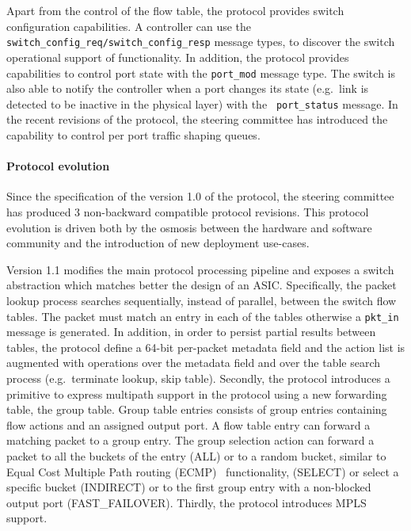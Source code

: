 Apart from the control of the flow table, the \of protocol provides switch
configuration capabilities. A controller can use the {\tt
  switch\_config\_req/switch\_config\_resp} message types, to discover the
switch operational support of \of functionality.  In addition, the protocol
provides capabilities to control port state with the {\tt port\_mod} message
type. The switch is also able to notify the controller when a port changes its
state (e.g.~link is detected to be inactive in the physical layer) with the {\tt
  port\_status} message. In the recent revisions of the protocol, the steering
committee has introduced the capability to control per port traffic shaping
queues. 

\paragraph{Protocol evolution} 

Since the specification of the version 1.0 of the protocol, the \of steering
committee has produced 3 non-backward compatible protocol revisions. This
protocol evolution is driven both by the osmosis between the hardware and
software community and the introduction of new deployment use-cases. 

Version 1.1  modifies the main protocol processing pipeline and exposes a switch
abstraction which matches better the design of an ASIC\@. Specifically, the packet
lookup process searches sequentially, instead of parallel, between the switch
flow tables.  The packet must match an entry in each of the tables otherwise a
{\tt pkt\_in} message is generated. In addition, in order to persist partial
results between tables, the protocol define a 64-bit per-packet metadata field
and the action list is augmented with operations over the metadata field and
over the table search process (e.g.~terminate lookup, skip table).  Secondly,
the protocol introduces a primitive to express multipath support in the protocol
using a new forwarding table, the group table.  Group table entries consists of
group entries containing flow actions and an assigned output port. A flow table
entry can forward a matching packet to a group entry. The group selection action
can forward a packet to all the buckets of the entry (ALL) or to a random
bucket, similar to Equal Cost Multiple Path routing (ECMP)~
functionality, (SELECT) or select a specific bucket (INDIRECT) or to the first
group entry with a non-blocked output port (FAST\_FAILOVER).  Thirdly, the
protocol introduces MPLS support.

